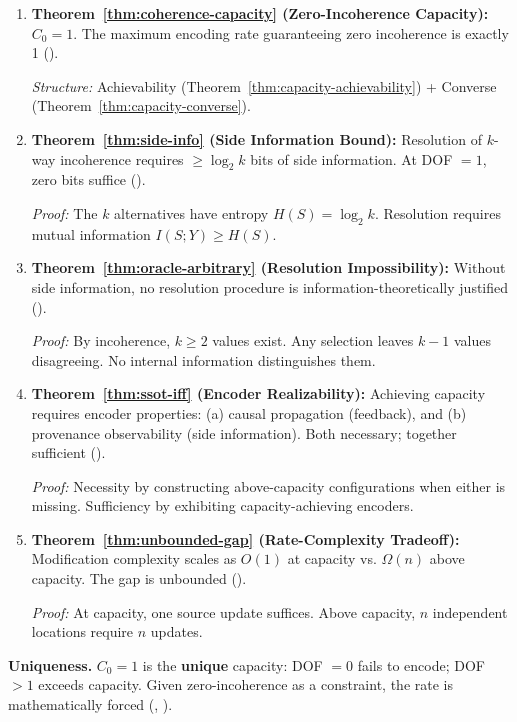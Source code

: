 \begin{enumerate}
\def\labelenumi{\arabic{enumi}.}
\item
  \textbf{Theorem~\ref{thm:coherence-capacity} (Zero-Incoherence Capacity):} $C_0 = 1$. The maximum encoding rate guaranteeing zero incoherence is exactly 1 ().

  \emph{Structure:} Achievability (Theorem~\ref{thm:capacity-achievability}) + Converse (Theorem~\ref{thm:capacity-converse}).

\item
  \textbf{Theorem~\ref{thm:side-info} (Side Information Bound):} Resolution of $k$-way incoherence requires $\geq \log_2 k$ bits of side information. At DOF $= 1$, zero bits suffice ().

  \emph{Proof:} The $k$ alternatives have entropy $H(S) = \log_2 k$. Resolution requires mutual information $I(S; Y) \geq H(S)$.

\item
  \textbf{Theorem~\ref{thm:oracle-arbitrary} (Resolution Impossibility):} Without side information, no resolution procedure is information-theoretically justified ().

  \emph{Proof:} By incoherence, $k \geq 2$ values exist. Any selection leaves $k-1$ values disagreeing. No internal information distinguishes them.

\item
  \textbf{Theorem~\ref{thm:ssot-iff} (Encoder Realizability):} Achieving capacity requires encoder properties: (a) causal propagation (feedback), and (b) provenance observability (side information). Both necessary; together sufficient ().

  \emph{Proof:} Necessity by constructing above-capacity configurations when either is missing. Sufficiency by exhibiting capacity-achieving encoders.

\item
  \textbf{Theorem~\ref{thm:unbounded-gap} (Rate-Complexity Tradeoff):} Modification complexity scales as $O(1)$ at capacity vs. $\Omega(n)$ above capacity. The gap is unbounded ().

  \emph{Proof:} At capacity, one source update suffices. Above capacity, $n$ independent locations require $n$ updates.
\end{enumerate}

\textbf{Uniqueness.} $C_0 = 1$ is the \textbf{unique} capacity: DOF $= 0$ fails to encode; DOF $> 1$ exceeds capacity. Given zero-incoherence as a constraint, the rate is mathematically forced (, ).

